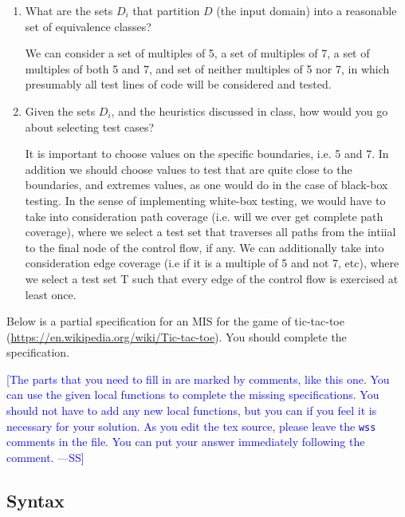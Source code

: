 \documentclass[12pt,fleqn]{examtst}
\newcommand{\authornote}[3]{\textcolor{#1}{[#3 ---#2]}}
\newcommand{\authornote}[3]{}
\newcommand{\wss}[1]{\authornote{blue}{SS}{#1}}
\begin{document}
\begin{enumerate}
\item What are the sets $D_i$ that partition $D$ (the input domain) into a
  reasonable set of equivalence classes?

  We can consider a set of multiples of 5, a set of multiples of 7, a set of multiples of both 5 and 7, and set of neither multiples of 5 nor 7, in which presumably all test lines of code will be considered and tested.

\item Given the sets $D_i$, and the heuristics discussed in class, how would you
  go about selecting test cases?

  It is important to choose values on the specific boundaries, i.e. 5 and 7. In addition we should choose values to test that are quite close to the boundaries, and extremes values, as one would do in the case of black-box testing. In the sense of implementing white-box testing, we would have to take into consideration path coverage (i.e. will we ever get complete path coverage), where we select a test set that traverses all paths from the intiial to the final node of the control flow, if any. We can additionally take into consideration edge coverage (i.e if it is a multiple of 5 and not 7, etc), where we select a test set T such that every edge of the control flow is exercised at least once.
  
\end{enumerate}
  

\newpage

 Below is a partial specification for an MIS for the game of
tic-tac-toe (\url{https://en.wikipedia.org/wiki/Tic-tac-toe}).  You should
complete the specification.

\bigskip

\wss{The parts that you need to fill in are marked by comments, like this one.
  You can use the given local functions to complete the missing specifications.
  You should not have to add any new local functions, but you can if you feel it
  is necessary for your solution.  As you edit the tex source, please leave the
  \texttt{wss} comments in the file.  You can put your answer immediately
  following the comment.}

\subsection* {Syntax}
\end{document}
